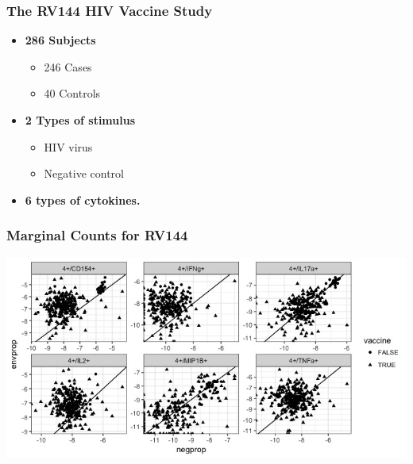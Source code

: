 \documentclass{beamer}
\theoremstyle{definition}
\begin{document}

\begin{frame}
\frametitle{The RV144 HIV Vaccine Study}
\begin{itemize}
\item \textbf{286 Subjects}
	\begin{itemize}
	\item 246 Cases
	\item 40 Controls
	\end{itemize}
\vspace{0.2 cm}
\item \textbf{2 Types of stimulus} 
	\begin{itemize}
	\item HIV virus
	\item Negative control
	\end{itemize}
\vspace{0.2 cm}
\item \textbf{6 types of cytokines.} 
\end{itemize}
\end{frame}


\begin{frame}
\frametitle{Marginal Counts for RV144}
\begin{center}
\includegraphics[scale=0.4]{figures/marginalScatterNoPost}
\end{center}
\end{frame}

\end{document}
